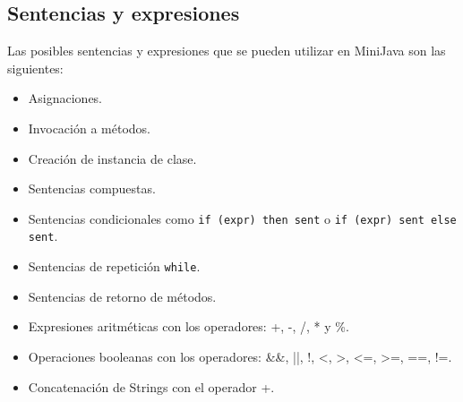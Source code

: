 \documentclass [a4paper,abstracton,titlepage]{scrartcl}
\begin{document}
\subsection{Sentencias y expresiones}

Las posibles sentencias y expresiones que se pueden utilizar en MiniJava son las siguientes:

\begin{itemize}
 \item Asignaciones.
 \item Invocación a métodos.
 \item Creación de instancia de clase.
 \item Sentencias compuestas.
 \item Sentencias condicionales como \texttt{if (expr) then sent} o \texttt{if (expr) sent else sent}.
 \item Sentencias de repetición \texttt{while}.
 \item Sentencias de retorno de métodos.
 \item Expresiones aritméticas con los operadores: +, -, /, * y \%.
 \item Operaciones booleanas con los operadores: \&\&, ||, !, <, >, <=, >=, ==, !=.
 \item Concatenación de Strings con el operador +.
\end{itemize}
\end{document}
